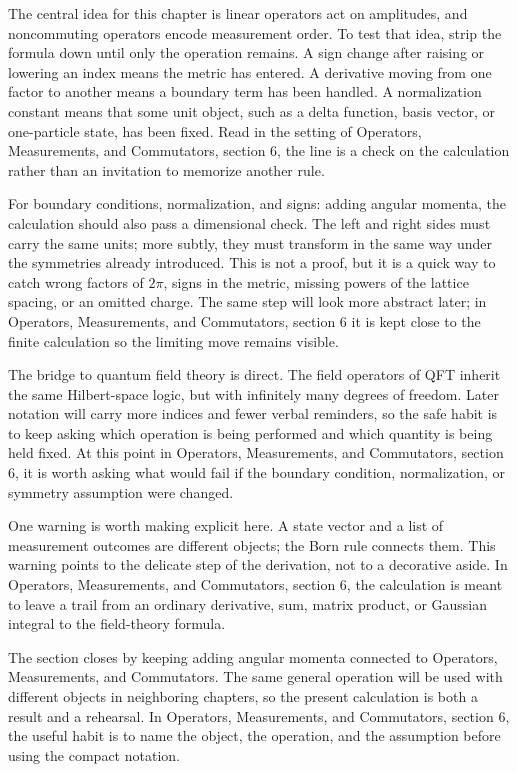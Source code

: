 The central idea for this chapter is linear operators act on amplitudes, and noncommuting operators encode measurement order.  To test that idea, strip the formula down until only the operation remains.  A sign change after raising or lowering an index means the metric has entered.  A derivative moving from one factor to another means a boundary term has been handled.  A normalization constant means that some unit object, such as a delta function, basis vector, or one-particle state, has been fixed.  Read in the setting of Operators, Measurements, and Commutators, section 6, the line is a check on the calculation rather than an invitation to memorize another rule.

For boundary conditions, normalization, and signs: adding angular momenta, the calculation should also pass a dimensional check.  The left and right sides must carry the same units; more subtly, they must transform in the same way under the symmetries already introduced.  This is not a proof, but it is a quick way to catch wrong factors of \(2\pi\), signs in the metric, missing powers of the lattice spacing, or an omitted charge.  The same step will look more abstract later; in Operators, Measurements, and Commutators, section 6 it is kept close to the finite calculation so the limiting move remains visible.

The bridge to quantum field theory is direct.  The field operators of QFT inherit the same Hilbert-space logic, but with infinitely many degrees of freedom.  Later notation will carry more indices and fewer verbal reminders, so the safe habit is to keep asking which operation is being performed and which quantity is being held fixed.  At this point in Operators, Measurements, and Commutators, section 6, it is worth asking what would fail if the boundary condition, normalization, or symmetry assumption were changed.

One warning is worth making explicit here.  A state vector and a list of measurement outcomes are different objects; the Born rule connects them.  This warning points to the delicate step of the derivation, not to a decorative aside.  In Operators, Measurements, and Commutators, section 6, the calculation is meant to leave a trail from an ordinary derivative, sum, matrix product, or Gaussian integral to the field-theory formula.

The section closes by keeping adding angular momenta connected to Operators, Measurements, and Commutators.  The same general operation will be used with different objects in neighboring chapters, so the present calculation is both a result and a rehearsal.  In Operators, Measurements, and Commutators, section 6, the useful habit is to name the object, the operation, and the assumption before using the compact notation.



